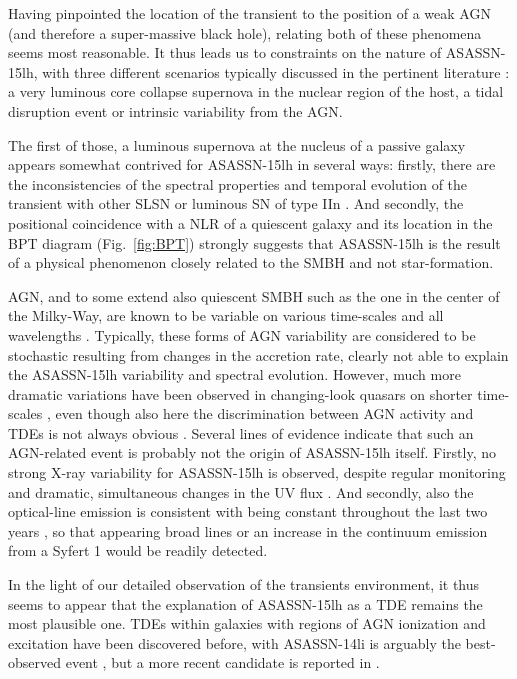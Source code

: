 \documentclass[traditabstract]{aa}
\begin{document}
Having pinpointed the location of the transient to the position of a weak AGN (and therefore a super-massive black hole), relating both of these phenomena seems most reasonable. It thus leads us to constraints on the nature of ASASSN-15lh, with three different scenarios typically discussed in the pertinent literature \citep[e.g.,][]{2011ApJ...735..106D, 2014MNRAS.445.3263H, 2015ApJ...798...12V}: a very luminous core collapse supernova in the nuclear region of the host, a tidal disruption event or intrinsic variability from the AGN.

The first of those, a luminous supernova at the nucleus of a passive galaxy appears somewhat contrived for ASASSN-15lh in several ways: firstly, there are the inconsistencies of the spectral properties and temporal evolution of the transient with other SLSN or luminous SN of type IIn \citep[e.g.,][]{2016NatAs...1E...2L}. And secondly, the positional coincidence with a NLR of a quiescent galaxy and its location in the BPT diagram (Fig.~\ref{fig:BPT}) strongly suggests that ASASSN-15lh is the result of a physical phenomenon closely related to the SMBH and not star-formation. 

AGN, and to some extend also quiescent SMBH such as the one in the center of the Milky-Way, are known to be variable on various time-scales and all wavelengths \citep[e.g.,][]{1997ARA&A..35..445U, 2001Natur.413...45B}. Typically, these forms of AGN variability are considered to be stochastic resulting from changes in the accretion rate, clearly not able to explain the ASASSN-15lh variability and spectral evolution. However, much more dramatic variations have been observed in changing-look quasars on shorter time-scales \citep[e.g.,][]{2014ApJ...788...48S, 2015ApJ...800..144L, 2017ApJ...835..144G}, even though also here the discrimination between AGN activity and TDEs is not always obvious \citep{2015MNRAS.452...69M}. Several lines of evidence indicate that such an AGN-related event is probably not the origin of ASASSN-15lh itself. Firstly, no strong X-ray variability for ASASSN-15lh is observed, despite regular monitoring and dramatic, simultaneous changes in the UV flux \citep{2016ApJ...828....3B, 2017ApJ...836...25M}. And secondly, also the optical-line emission is consistent with being constant throughout the last two years \citep{2016NatAs...1E...2L}, so that appearing broad lines or an increase in the continuum emission from a Syfert 1 would be readily detected.

In the light of our detailed observation of the transients environment, it thus seems to appear that the explanation of ASASSN-15lh as a TDE \citep{2016NatAs...1E...2L, 2017ApJ...836...25M} remains the most plausible one. TDEs within galaxies with regions of AGN ionization and excitation have been discovered before, with ASASSN-14li is arguably the best-observed event \citep{2016MNRAS.455.2918H, 2016ApJ...830L..32P}, but a more recent candidate is reported in \citet{2017arXiv170307816B}. 
\end{document}
